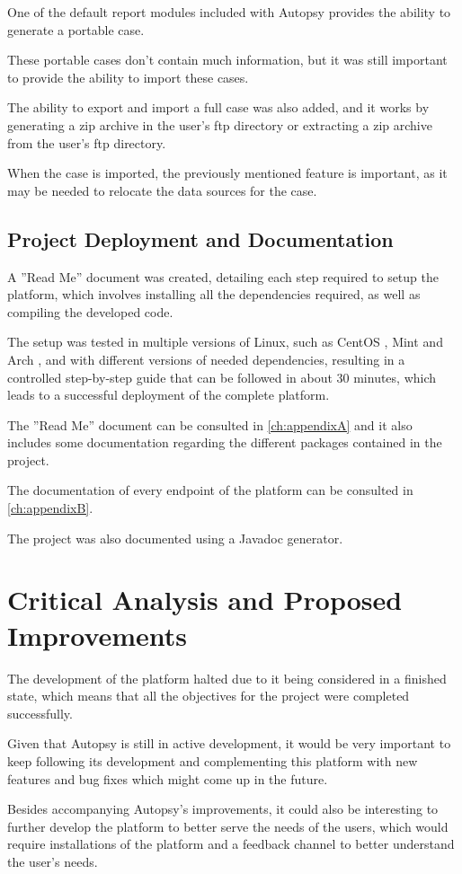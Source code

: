 One of the default report modules included with Autopsy provides the ability to generate a portable case.

These portable cases don't contain much information, but it was still important to provide the ability to import these cases.

The ability to export and import a full case was also added, and it works by generating a zip archive in the user's \acrshort{ftp} directory or extracting a zip archive from the user's \acrshort{ftp} directory.

When the case is imported, the previously mentioned feature is important, as it may be needed to relocate the data sources for the case.

\subsection{Project Deployment and Documentation}

A ''Read Me'' document was created, detailing each step required to setup the platform, which involves installing all the dependencies required, as well as compiling the developed code.

The setup was tested in multiple versions of Linux,  such as CentOS \cite{centos}, Mint \cite{mint} and Arch \cite{arch}, and with different versions of needed dependencies, 
resulting in a controlled step-by-step guide that can be followed in about 30 minutes, which leads to a successful deployment of the complete platform.

The ''Read Me'' document can be consulted in \autoref{ch:appendixA} and it also includes some documentation regarding the different packages contained in the project.

The documentation of every endpoint of the platform can be consulted in \autoref{ch:appendixB}.

The project was also documented using a Javadoc \cite{javadoc} generator.

\section{Critical Analysis and Proposed Improvements}

The development of the platform halted due to it being considered in a finished state, which means that all the objectives for the project were completed successfully.

Given that Autopsy is still in active development, it would be very important to keep following its development and complementing this platform with new features and bug fixes which might come up in the future.

Besides accompanying Autopsy's improvements, it could also be interesting to further develop the platform to better serve the needs of the users, which would require installations of the platform and a feedback channel to better understand the user's needs.
